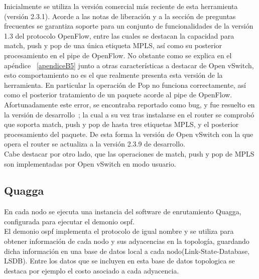 Inicialmente se utiliza la versi\'on comercial m\'as reciente de esta herramienta (versi\'on 2.3.1). Acorde a las notas de liberaci\'on y a la secci\'on de preguntas frecuentes se garantiza soporte para un conjunto de funcionalidades de la versi\'on 1.3 del protocolo OpenFlow, entre las cuales se destacan la capacidad para match, push y pop de una \'unica etiqueta MPLS, así como su posterior procesamiento en el pipe de OpenFlow. No obstante como se explica en el apéndice ~\ref{apendiceB5} junto a otras características a destacar de Open vSwitch, esto comportamiento no es el que realmente presenta esta versi\'on de la herramienta. En particular la operación de Pop no funciona correctamente, así como el posterior tratamiento de un paquete acorde al pipe de OpenFlow.\\ 

Afortunadamente este error, se encontraba reportado como bug, y fue resuelto en la versi\'on de desarrollo~\citep{OVSSourceCode}; la cual a su vez tras instalarse en el router se comprobó que soporta match, push y pop de hasta tres etiquetas MPLS, y el posterior procesamiento del paquete. De esta forma la versi\'on de Open vSwitch con la que opera el router se actualiza a la versi\'on 2.3.9 de desarrollo.\\

Cabe destacar por otro lado, que las operaciones de match, push y pop de MPLS son implementadas por Open vSwitch en modo usuario.


\subsection{Quagga}
En cada nodo se ejecuta una instancia del software de enrutamiento Quagga, configurada para ejecutar el demonio ospf.\\ 

El demonio ospf implementa el protocolo de igual nombre y se utiliza para obtener información de cada nodo y sus adyacencias en la topolog\'ia, guardando dicha información en una base de datos local a cada nodo(Link-State-Database, LSDB). Entre los datos que se incluyen en esta base de datos topologica se destaca por ejemplo el costo asociado a cada adyacencia.\\ 

